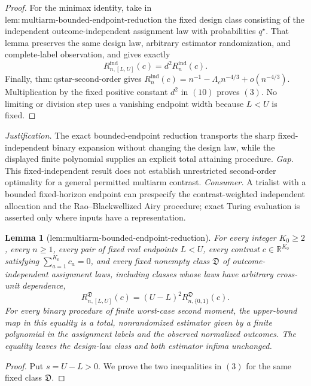 \documentclass{article}
\newtheorem{lemma}{Lemma}
\begin{document}
{\begin{proof}
For the minimax identity, take in \(\mathrm{lem:multiarm\text{-}bounded\text{-}endpoint\text{-}reduction}\) the fixed design class consisting of the independent outcome-independent assignment law with probabilities \(q^\star\). That lemma preserves the same design law, arbitrary estimator randomization, and complete-label observation, and gives exactly
\[
R_{n,[L,U]}^{\mathrm{ind}}(c)=d^2R_n^{\mathrm{ind}}(c).
\tag{10}
\]
Finally, \(\mathrm{thm:qstar\text{-}second\text{-}order}\) gives
\(R_n^{\mathrm{ind}}(c)=n^{-1}-\Lambda_cn^{-4/3}+o(n^{-4/3})\). Multiplication by the fixed positive constant \(d^2\) in \((10)\) proves \((3)\). No limiting or division step uses a vanishing endpoint width because \(L<U\) is fixed.
\end{proof}
\par\smallskip\noindent \textit{Justification.} The exact bounded-endpoint reduction transports the sharp fixed-independent binary expansion without changing the design law, while the displayed finite polynomial supplies an explicit total attaining procedure. \textit{Gap.} This fixed-independent result does not establish unrestricted second-order optimality for a general permitted multiarm contrast. \textit{Consumer.} A trialist with a bounded fixed-horizon endpoint can prespecify the contrast-weighted independent allocation and the Rao--Blackwellized Airy procedure; exact Turing evaluation is asserted only where inputs have a representation.

\begin{lemma}[lem:multiarm-bounded-endpoint-reduction]\label{lem:multiarm-bounded-endpoint-reduction}
For every integer \(K_0\ge2\), every \(n\ge1\), every pair of fixed real endpoints \(L<U\), every contrast \(c\in\mathbb R^{K_0}\) satisfying \(\sum_{a=1}^{K_0}c_a=0\), and every fixed nonempty class \(\mathfrak D\) of outcome-independent assignment laws, including classes whose laws have arbitrary cross-unit dependence,
\[
 R^{\mathfrak D}_{n,[L,U]}(c)
 =(U-L)^2R^{\mathfrak D}_{n,\{0,1\}}(c).
\tag{3}
\]
For every binary procedure of finite worst-case second moment, the upper-bound map in this equality is a total, nonrandomized estimator given by a finite polynomial in the assignment labels and the observed normalized outcomes.  The equality leaves the design-law class and both estimator infima unchanged.
\end{lemma}
\begin{proof}
Put \(s=U-L>0\).  We prove the two inequalities in \((3)\) for the same fixed class \(\mathfrak D\).


\end{proof}}
\end{document}
